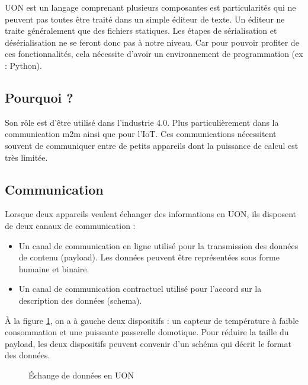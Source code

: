 \documentclass[
    iict, %
    il, %
]{heig-tb}
\begin{document}
UON est un langage comprenant plusieurs composantes est particularités qui ne peuvent pas toutes être traité dans un simple éditeur de texte.
Un éditeur ne traite généralement que des fichiers statiques.
Les étapes de sérialisation et désérialisation ne se feront donc pas à notre niveau.
Car pour pouvoir profiter de ces fonctionnalités, cela nécessite d'avoir un environnement de programmation (ex : Python).

\subsection{Pourquoi ?}
Son rôle est d'être utilisé dans l'industrie 4.0. Plus particulièrement dans la communication \Gls{m2m} ainsi que pour l'\Gls{IoT}.
Ces communications nécessitent souvent de communiquer entre de petits appareils dont la puissance de calcul est très limitée.

\subsection{Communication}
Lorsque deux appareils veulent échanger des informations en UON, ils disposent de deux canaux de communication :
\begin{itemize}
    \item Un canal de communication en ligne utilisé pour la transmission des données de contenu (payload). Les données peuvent être représentées sous forme humaine et binaire.
    \item Un canal de communication contractuel utilisé pour l'accord sur la description des données (schema).
\end{itemize}

\vspace{\parskip}

À la figure \ref{data-exchange}, on a à gauche deux dispositifs : un capteur de température à faible consommation
et une puissante passerelle domotique. Pour réduire la taille du payload, les deux dispositifs peuvent convenir d'un schéma qui décrit le format des données.

\begin{figure}[H]
    \begin{center}
    \end{center}
    \caption[Échange de données en UON]{\label{data-exchange}Échange de données en UON}
\end{figure}
\end{document}
